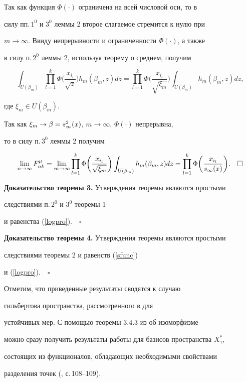Так как функция $\Phi(\cdot)$ ограничена на всей числовой оси, то в 


силу пп.\,$1^0$ и $3^0$ леммы 2 второе слагаемое стремится к нулю при


$m\to\infty$. Ввиду непрерывности и ограниченности $\Phi(\cdot)$, а также 


в силу п.\,$2^0$ леммы 2, используя теорему о среднем, получим


$$


\int_{U(\beta_m)}\prod_{l=1}^k\Phi\bigg(\frac{x_{i_l}}


{\sqrt{z}}\bigg)h_m(\beta_m,z)dz=\prod_{l=1}^k\Phi\bigg(\frac{x_{i_l}}


{\sqrt{\xi_m}}\bigg)\int_{U(\beta_m)}h_m(\beta_m,z)dz,


$$


где $\xi_m\in U(\beta_m)$.


Так как $\xi_m\to\beta=s^2_\infty(x)$, $m\to\infty$, $\Phi(\cdot)$ непрерывна, 


то в силу п.\,$3^0$ леммы 2 получим


$$


\lim_{n\to\infty}F^\mu_{nk}=


\lim_{m\to\infty}\prod_{l=1}^k\Phi\bigg(\frac{x_{i_l}}


{\sqrt{\xi_m}}\bigg)\int_{U(\beta_m)}h_m(\beta_m,z)dz= 


\prod_{l=1}^k\Phi\bigg(\frac{x_{i_l}}{\s}\bigg).\quad\square


$$





{\bf Доказательство теоремы 3.} Утверждения теоремы являются простыми 


следствиями п.\,$2^0$ и $3^0$ теоремы 1


и равенства (\ref{logpro}).$\quad\square$





{\bf Доказательство теоремы 4.} Утверждения теоремы являются простыми 


следствиями теоремы 2 и равенств (\ref{sfunc})


и (\ref{logpro}).$\quad\square$








\begin{notenonum}


Отметим, что приведенные результаты сводятся к случаю


гильбертова пространства, рассмотренного в \cite{Shats} для


устойчивых мер. С помощью теоремы 3.4.3 из \cite{Bogach} об изоморфизме


можно сразу получить результаты работы для базисов пространства $X^*_\gamma$,


состоящих из функционалов, обладающих необходимыми свойствами


разделения точек (\cite{Bogach}, с.\,108--109).


\end{notenonum}








